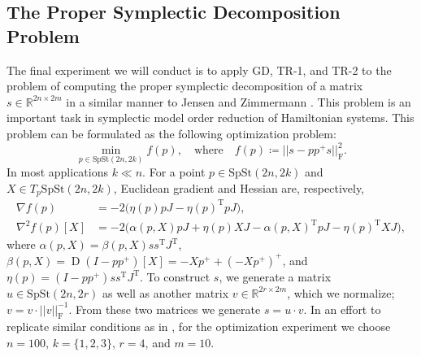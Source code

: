\newpage
\subsection{The Proper Symplectic Decomposition Problem}\label{sec:symplectic_decomposition}
The final experiment we will conduct is to apply GD, TR-1, and TR-2 to the problem of computing the proper symplectic decomposition of a matrix $s\in \mathbb{R}^{2n\times 2m}$ in a similar manner to Jensen and Zimmermann \cite[p.~18]{JensenZimmermann2024}. This problem is an important task in symplectic model order reduction of Hamiltonian systems. This problem can be formulated as the following optimization problem:
%
\begin{equation}
\min_{p \in \mathrm{SpSt}(2n, 2k)}f(p),\quad\text{where}\quad f(p)\coloneqq\lvert \lvert s-pp^{+}s \rvert  \rvert _{\mathrm{F}}^{2}.
\end{equation}
%
In most applications $k\ll n$. For a point $p\in \mathrm{SpSt}(2n, 2k)$ and $X\in T_{p}\mathrm{SpSt}(2n, 2k)$, Euclidean gradient and Hessian are, respectively,
%
\begin{align*}
\nabla f(p)&=-2\big(\eta(p)pJ-\eta(p)^{\mathrm{T}}pJ\big), \\
\nabla^{2}f(p)[X]&=-2\big(\alpha(p,X)pJ+\eta(p) XJ-\alpha(p,X)^{\mathrm{T}}pJ-\eta(p)^{\mathrm{T}}XJ\big),
\end{align*}
%
where $\alpha(p,X)=\beta(p,X)ss^{\mathrm{T}}J^{\mathrm{T}}$, $\beta(p,X)=\operatorname{D}(I-pp^{+})[X]=-Xp^{+}+(-Xp^{+})^{+}$, and \\$\eta(p)=(I-pp^{+})ss^{\mathrm{T}}J^{\mathrm{T}}$. To construct $s$, we generate a matrix $u\in \mathrm{SpSt}(2n, 2r)$ as well as another matrix $v\in \mathbb{R}^{2r\times 2m}$, which we normalize; $v=v\cdot \lvert \lvert v \rvert \rvert_{\mathrm{F}}^{-1}$. From these two matrices we generate $s=u\cdot v$. In an effort to replicate similar conditions as in \cite[p.~18]{JensenZimmermann2024}, for the  optimization experiment we choose $n=100$, $k=\{1,2,3\}$, $r=4$, and $m=10$. 

